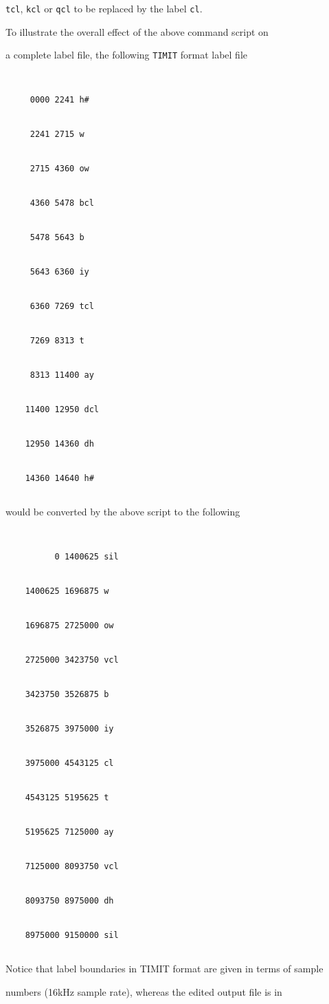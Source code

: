 \texttt{tcl}, \texttt{kcl} or \texttt{qcl} to be replaced by the label \texttt{cl}.





To illustrate the overall effect of the above  command script on


a complete label file, the following \texttt{TIMIT} format label file


\begin{verbatim}


     0000 2241 h#


     2241 2715 w


     2715 4360 ow


     4360 5478 bcl


     5478 5643 b


     5643 6360 iy


     6360 7269 tcl


     7269 8313 t


     8313 11400 ay


    11400 12950 dcl


    12950 14360 dh


    14360 14640 h#


\end{verbatim}


would be converted by the above script to the following


\begin{verbatim}


          0 1400625 sil 


    1400625 1696875 w 


    1696875 2725000 ow 


    2725000 3423750 vcl 


    3423750 3526875 b 


    3526875 3975000 iy 


    3975000 4543125 cl 


    4543125 5195625 t 


    5195625 7125000 ay 


    7125000 8093750 vcl 


    8093750 8975000 dh 


    8975000 9150000 sil 


\end{verbatim}


Notice that label boundaries in TIMIT format are given in terms of sample


numbers (16kHz sample rate), whereas the edited output file is in 



